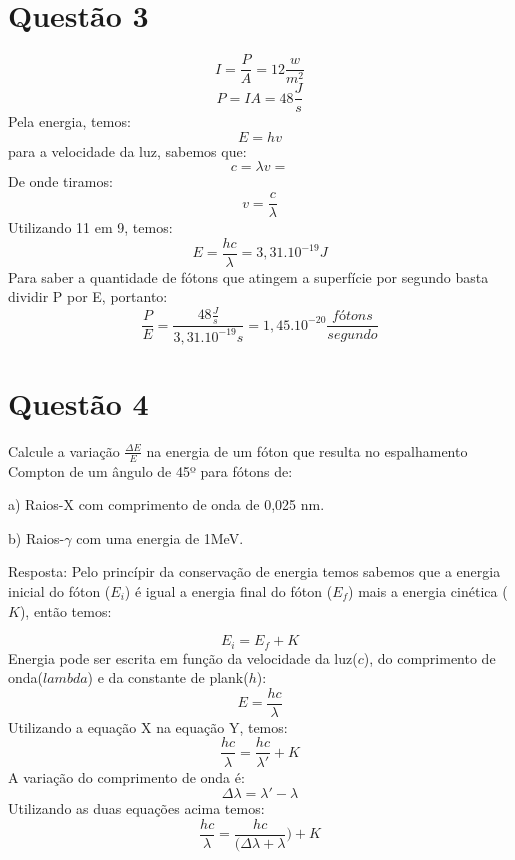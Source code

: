\documentclass{article}
\begin{document}
\section {Questão 3}
\begin{equation}
    {I =\frac{P}{A} = 12 \frac{w}{m^2}}
\end{equation}
\begin{equation}
    {P =IA = 48 \frac{J}{s}}
\end{equation}
Pela energia, temos:
\begin{equation}
    {E = hv}
\end{equation}
para a velocidade da luz, sabemos que:
\begin{equation}
    {c = \lambda v =}
\end{equation}
De onde tiramos:
\begin{equation}
    {v = \frac{c}{\lambda}}
\end{equation}
Utilizando 11 em 9, temos:
\begin{equation}
    {E = \frac{hc}{\lambda} = 3,31.10^{-19}J}
\end{equation}
Para saber a quantidade de fótons que atingem a superfície por segundo basta dividir P por E, portanto:
\begin{equation}
    {\frac{P}{E} = \frac{48 \frac{J}{s}}{3,31.10^{-19}s} = 1,45.10^{-20}\frac{fótons}{segundo}}
\end{equation}


\section {Questão 4}
Calcule a variação $\frac{\Delta E}{E}$ na energia de um fóton que resulta no espalhamento Compton de um ângulo de 45º para fótons de:

    a) Raios-X com comprimento de onda de 0,025 nm.
    
    b) Raios-$\gamma$ com uma energia de 1MeV. 

Resposta:
Pelo princípir da conservação de energia temos sabemos que a energia inicial do fóton ($E_i$) é igual a energia final do fóton ($E_f$) mais a energia cinética ($K$), então temos:

\begin{equation}
    { E_i = E_f + K}
\end{equation}
Energia pode ser escrita em função da velocidade da luz($c$), do comprimento de onda($lambda$) e da constante de plank($h$):
\begin{equation}
    { E = \frac{hc}{\lambda}}
\end{equation}
Utilizando a equação X na equação Y, temos:
\begin{equation}
    { \frac{hc}{\lambda} = \frac{hc}{\lambda'} + K}
\end{equation}
A variação do comprimento de onda é:
\begin{equation}
    { \Delta\lambda = \lambda' - \lambda}
\end{equation}
Utilizando as duas equações acima temos:
\begin{equation}
    { \frac{hc}{\lambda} = \frac{hc}{(\Delta\lambda + \lambda}) + K}
\end{equation}
\end{document}
